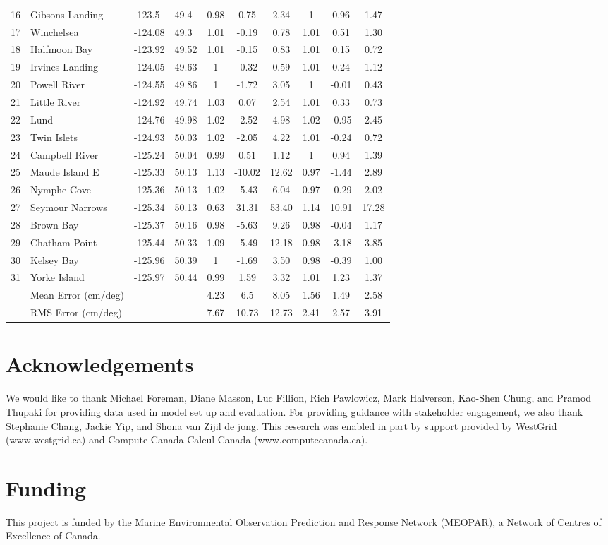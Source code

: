\documentclass{tATO2e}
\begin{document}
\begin{table}[h]
{\begin{tabular}{l l l l c c c c c c}
16 & Gibsons Landing & -123.5 & 49.4 & 0.98 & 0.75 & 2.34  & 1 & 0.96 & 1.47 \\
17 & Winchelsea & -124.08 & 49.3 & 1.01 & -0.19 & 0.78  & 1.01 & 0.51 & 1.30 \\
18 & Halfmoon Bay & -123.92 & 49.52 & 1.01 & -0.15 & 0.83  & 1.01 & 0.15 & 0.72\\ 
19 & Irvines Landing & -124.05 & 49.63 & 1 & -0.32 & 0.59  & 1.01 & 0.24 & 1.12 \\
20 & Powell River & -124.55 & 49.86 & 1 & -1.72 & 3.05  & 1 & -0.01 & 0.43 \\
21 & Little River & -124.92 & 49.74 & 1.03 & 0.07 & 2.54  & 1.01 & 0.33 & 0.73\\ 
22 & Lund & -124.76 & 49.98 & 1.02 & -2.52 & 4.98  & 1.02 & -0.95 & 2.45 \\
23 & Twin Islets & -124.93 & 50.03 & 1.02 & -2.05 & 4.22  & 1.01 & -0.24 & 0.72\\ 
24 & Campbell River & -125.24 & 50.04 & 0.99 & 0.51 & 1.12  & 1 & 0.94 & 1.39 \\
25 & Maude Island E & -125.33 & 50.13 & 1.13 & -10.02 & 12.62  & 0.97 & -1.44 & 2.89\\ 
26 & Nymphe Cove & -125.36 & 50.13 & 1.02 & -5.43 & 6.04  & 0.97 & -0.29 & 2.02 \\
27 & Seymour Narrows & -125.34 & 50.13 & 0.63 & 31.31 & 53.40  & 1.14 & 10.91 & 17.28 \\
28 & Brown Bay & -125.37 & 50.16 & 0.98 & -5.63 & 9.26  & 0.98 & -0.04 & 1.17 \\
29 & Chatham Point & -125.44 & 50.33 & 1.09 & -5.49 & 12.18  & 0.98 & -3.18 & 3.85 \\
30 & Kelsey Bay & -125.96 & 50.39 & 1 & -1.69 & 3.50  & 0.98 & -0.39 & 1.00 \\
31 & Yorke Island & -125.97 & 50.44 & 0.99 & 1.59 & 3.32  & 1.01 & 1.23 & 1.37\\ 
\hline 
&   Mean Error (cm/deg) & & & 4.23  & 6.5 & 8.05   & 1.56 & 1.49 & 2.58 \\
&   RMS Error (cm/deg)  & & & 7.67  & 10.73 & 12.73 & 2.41 & 2.57 & 3.91 \\
\hline  
\end{tabular}}
\label{tab:comparison} 
\end{table}


\section*{Acknowledgements}\label{sec:ack}
We would like to thank Michael Foreman, Diane Masson, Luc Fillion, Rich Pawlowicz, Mark Halverson, Kao-Shen Chung, and Pramod Thupaki for providing data used in model set up and evaluation. For providing guidance with stakeholder engagement, we also thank Stephanie Chang, Jackie Yip, and Shona van Zijil de jong. This research was enabled in part by support provided by WestGrid (www.westgrid.ca) and Compute Canada Calcul Canada (www.computecanada.ca).

\section*{Funding}
This project is funded by the Marine Environmental Observation Prediction and Response Network (MEOPAR), a Network of Centres of Excellence of Canada.



\end{document}
